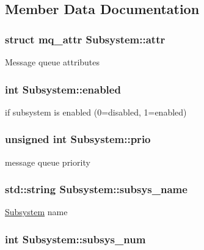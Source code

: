 \subsection{Member Data Documentation}
\hypertarget{classSubsystem_abbb7a2f8cb57fa70eaf65c1b7c353e08}{
\subsubsection[{attr}]{\setlength{\rightskip}{0pt plus 5cm}struct mq\-\_\-attr Subsystem\-::attr\hspace{0.3cm}{\ttfamily [protected]}}}\label{classSubsystem_abbb7a2f8cb57fa70eaf65c1b7c353e08}
Message queue attributes \hypertarget{classSubsystem_a3c1751f0ac60254618dc22f1b75fbfda}{
\subsubsection[{enabled}]{\setlength{\rightskip}{0pt plus 5cm}int Subsystem\-::enabled}}\label{classSubsystem_a3c1751f0ac60254618dc22f1b75fbfda}
if subsystem is enabled (0=disabled, 1=enabled) \hypertarget{classSubsystem_a71c9d55e3baa41c75bbc54e9e4407bdd}{
\subsubsection[{prio}]{\setlength{\rightskip}{0pt plus 5cm}unsigned int Subsystem\-::prio\hspace{0.3cm}{\ttfamily [protected]}}}\label{classSubsystem_a71c9d55e3baa41c75bbc54e9e4407bdd}
message queue priority \hypertarget{classSubsystem_a731ef7c72752c9fafba06225a21e77ba}{
\subsubsection[{subsys\-\_\-name}]{\setlength{\rightskip}{0pt plus 5cm}std\-::string Subsystem\-::subsys\-\_\-name}}\label{classSubsystem_a731ef7c72752c9fafba06225a21e77ba}
\hyperlink{classSubsystem}{Subsystem} name \hypertarget{classSubsystem_af5095f64990120d1ff8e1e07c7c1ee77}{
\subsubsection[{subsys\-\_\-num}]{\setlength{\rightskip}{0pt plus 5cm}int Subsystem\-::subsys\-\_\-num}}\label{classSubsystem_af5095f64990120d1ff8e1e07c7c1ee77}
